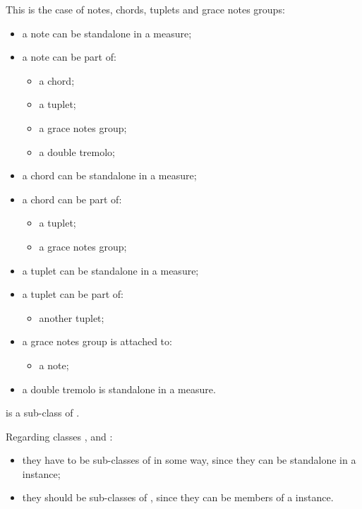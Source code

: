 This is the case of notes, chords, tuplets and grace notes groups:
\begin{itemize}
\item a note can be standalone in a measure;
\item a note can be part of:
  \begin{itemize}
  \item a chord;
  \item a tuplet;
  \item a grace notes group;
  \item a double tremolo;
  \end{itemize}

\item a chord can be standalone in a measure;
\item a chord can be part of:
  \begin{itemize}
  \item a tuplet;
  \item a grace notes group;
  \end{itemize}

\item a tuplet can be standalone in a measure;
\item a tuplet can be part of:
  \begin{itemize}
  \item another tuplet;
  \end{itemize}

\item a grace notes group is attached to:
  \begin{itemize}
  \item a note;
  \end{itemize}

\item a double tremolo is standalone in a measure.
\end{itemize}

 is a sub-class   of .

Regarding classes ,  and :
\begin{itemize}
\item they have to be sub-classes of  in some way, since they can be standalone in a  instance;

\item they should be sub-classes of , since they can be members of a  instance.
\end{itemize}


